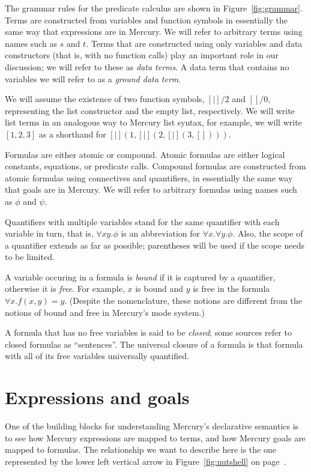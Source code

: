 The grammar rules for the predicate calculus
are shown in Figure~\ref{fig:grammar}.
Terms are constructed from variables and function symbols
in essentially the same way that expressions are in Mercury.
We will refer to arbitrary terms using names such as $s$ and $t$.
Terms that are constructed using only variables and data constructors
(that is, with no function calls)
play an important role in our discussion;
we will refer to these as \emph{data terms}.
A data term that contains no variables
we will refer to as a \emph{ground data term}.

We will assume the existence of two function symbols,
$[|]/2$ and $[]/0$,
representing the list constructor and the empty list,
respectively.
We will write list terms in an analogous way to Mercury list syntax,
for example,
we will write
$[1, 2, 3]$ as a shorthand for $[|](1, [|](2, [|](3, [])))$.

Formulas are either atomic or compound.
Atomic formulas are either
logical constants, equations, or predicate calls.
Compound formulas are constructed from atomic formulas
using connectives and quantifiers,
in essentially the same way that goals are in Mercury.
We will refer to arbitrary formulas
using names such as $\phi$ and $\psi$.

Quantifiers with multiple variables stand for
the same quantifier with each variable in turn,
that is, $\forall x y.\phi$
is an abbreviation for $\forall x.\forall y.\phi$.
Also, the scope of a quantifier extends as far as possible;
parentheses will be used if the scope needs to be limited.

A variable occuring in a formula is \emph{bound\label{gi:bound}}
if it is captured by a quantifier,
otherwise it is \emph{free\label{gi:free}}.
For example,
$x$ is bound and $y$ is free
in the formula $\forall x. f(x, y) = y$.
(Despite the nomenclature,
these notions are different from the notions of bound and free
in Mercury's mode system.)

A formula that has no free variables
is said to be \emph{closed\label{gi:closed-formula}};
some sources refer to closed formulas as ``sentences''.
The universal closure of a formula is that formula with
all of its free variables universally quantified.


\section{Expressions and goals}
\label{sec:goals}

One of the building blocks
for understanding Mercury's declarative semantics
is to see how Mercury expressions are mapped to terms,
and how Mercury goals are mapped to formulas.
The relationship we want to describe here is
the one represented by the lower left vertical arrow
in Figure~\ref{fig:nutshell} on page~\pageref{fig:nutshell}.

